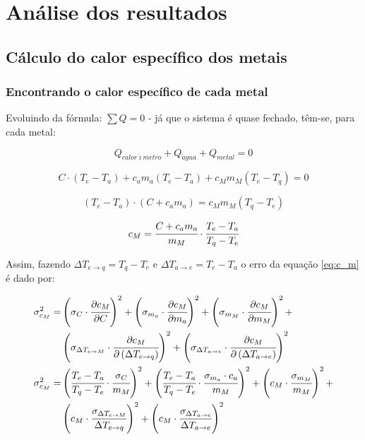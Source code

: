 \documentclass[a4paper]{article}
\begin{document}
	\section{Análise dos resultados}


		\subsection{Cálculo do calor específico dos metais}


			\subsubsection{Encontrando o calor específico de cada metal}

				Evoluindo da fórmula: $\sum Q=0$ - já que o sistema é quase fechado,
				têm-se, para cada metal:

				\begin{equation}
					Q_{calor\acute{\imath}metro}+Q_{\acute{a}gua}+Q_{metal}=0
				\end{equation}


				\[
					C\cdot\left(T_{e}-T_{a}\right)+c_{a}m_{a}\left(T_{e}-T_{a}\right)+c_{M}m_{M}\left(T_{e}-T_{q}\right)=0
				\]


				\[
					\left(T_{e}-T_{a}\right)\cdot\left(C+c_{a}m_{a}\right)=c_{M}m_{M}\left(T_{q}-T_{e}\right)
				\]


				\begin{equation}
					c_{M}=\cfrac{C+c_{a}m_{a}}{m_{M}}\cdot\cfrac{T_{e}-T_{a}}{T_{q}-T_{e}}\label{eq:c_m}
				\end{equation}


				Assim, fazendo $\Delta T_{e\rightarrow q}=T_{q}-T_{e}$ e $\Delta T_{a\rightarrow e}=T_{e}-T_{a}$
				o erro da equação \eqref{eq:c_m} é dado por:

				\begin{align*}
					\sigma_{c_{M}}^{2} = &
						\left(\sigma_{C}\cdot\cfrac{\partial c_{M}}{\partial C}\right)^{2}+
						\left(\sigma_{m_{a}}\cdot\cfrac{\partial c_{M}}{\partial m_{a}}\right)^{2}+
						\left(\sigma_{m_{M}}\cdot\cfrac{\partial c_{M}}{\partial m_{M}}\right)^{2}+
						\\ &
						\left(\sigma_{\Delta T_{e\rightarrow M}}\cdot\cfrac{\partial c_{M}}{\partial
							\left(\Delta T_{e\rightarrow q}\right)}\right)^{2}+
						\left(\sigma_{\Delta T_{a\rightarrow e}}\cdot\cfrac{\partial c_{M}}{\partial
							\left(\Delta T_{a\rightarrow e}\right)}\right)^{2}
                	\\
				    \sigma_{c_{M}}^{2} = & 
				        \left(\cfrac{T_{e}-T_{a}}{T_{q}-T_{e}}\cdot\cfrac{\sigma_{C}}{m_{M}}\right)^{2}+
						\left(\cfrac{T_{e}-T_{a}}{T_{q}-T_{e}}\cdot\cfrac{\sigma_{m_{a}}\cdot c_{a}}{m_{M}}\right)^{2}+
						\left(c_{M}\cdot\cfrac{\sigma_{m_{M}}}{m_{M}}\right)^{2}+ \\ &
						\left(c_{M}\cdot\cfrac{\sigma_{\Delta T_{e\rightarrow M}}}{\Delta T_{e\rightarrow q}}\right)^{2}+
						\left(c_{M}\cdot\cfrac{\sigma_{\Delta T_{a\rightarrow e}}}{\Delta T_{a\rightarrow e}}\right)^{2}
				\end{align*}
\end{document}
